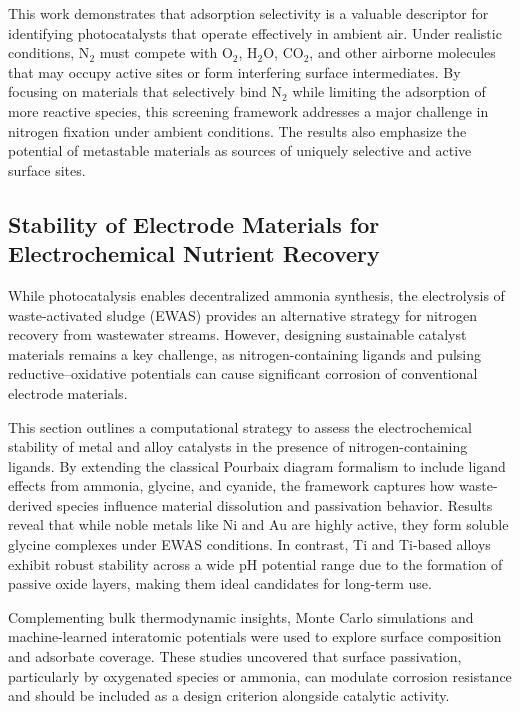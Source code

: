 This work demonstrates that adsorption selectivity is a valuable descriptor for identifying photocatalysts that operate effectively in ambient air. Under realistic conditions, N$_2$ must compete with O$_2$, H$_2$O, CO$_2$, and other airborne molecules that may occupy active sites or form interfering surface intermediates. By focusing on materials that selectively bind N$_2$ while limiting the adsorption of more reactive species, this screening framework addresses a major challenge in nitrogen fixation under ambient conditions. The results also emphasize the potential of metastable materials as sources of uniquely selective and active surface sites.

\subsection{Stability of Electrode Materials for Electrochemical Nutrient Recovery}

While photocatalysis enables decentralized ammonia synthesis, the electrolysis of waste-activated sludge (EWAS) provides an alternative strategy for nitrogen recovery from wastewater streams. However, designing sustainable catalyst materials remains a key challenge, as nitrogen-containing ligands and pulsing reductive–oxidative potentials can cause significant corrosion of conventional electrode materials.

This section outlines a computational strategy to assess the electrochemical stability of metal and alloy catalysts in the presence of nitrogen-containing ligands. By extending the classical Pourbaix diagram formalism to include ligand effects from ammonia, glycine, and cyanide, the framework captures how waste-derived species influence material dissolution and passivation behavior. Results reveal that while noble metals like Ni and Au are highly active, they form soluble glycine complexes under EWAS conditions. In contrast, Ti and Ti-based alloys exhibit robust stability across a wide pH potential range due to the formation of passive oxide layers, making them ideal candidates for long-term use.

Complementing bulk thermodynamic insights, Monte Carlo simulations and machine-learned interatomic potentials were used to explore surface composition and adsorbate coverage. These studies uncovered that surface passivation, particularly by oxygenated species or ammonia, can modulate corrosion resistance and should be included as a design criterion alongside catalytic activity.

